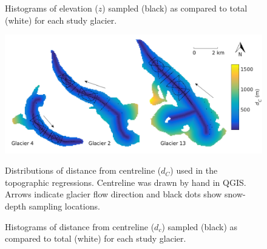 \documentclass{sfuthesis}
\newcommand{\topomap}{Arrows indicate glacier flow direction and black dots show snow-depth sampling locations. }
\begin{document}
{\begin{figure}[H]
	\caption[Histograms of full and sampled elevation ($z$)]{Histograms of elevation ($z$) sampled (black) as compared to total (white) for each study glacier.}
	\label{sampledRange:elev}
\end{figure}

\begin{figure}[H]
	\centering
	\includegraphics[width=\textwidth]{Map_centreD.png}\\
	\caption[Distributions of distance from centreline ($d_C$)]{Distributions of distance from centreline ($d_C$) used in the topographic regressions. Centreline was drawn by hand in QGIS. \topomap}
	\label{map:centreD}
\end{figure}

\begin{figure}[H]
	\caption[Histograms of full and sampled distance from centreline ($d_c$) ]{Histograms of distance from centreline ($d_c$) sampled (black) as compared to total (white) for each study glacier.}
	\label{sampledRange:centreD}
\end{figure}

}
\end{document}
